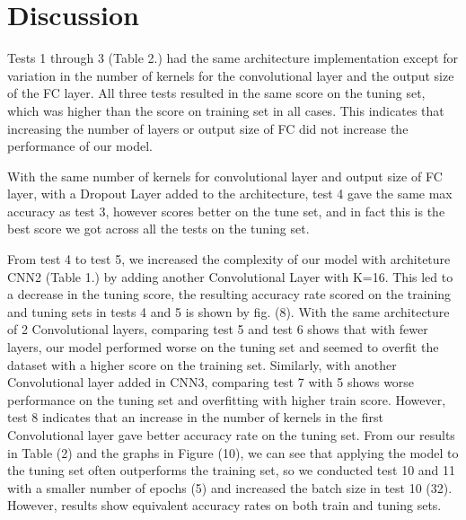 \documentclass{article}
\begin{document}
\section{Discussion}
Tests 1 through 3 (Table 2.) had the same architecture implementation except for variation in the number of kernels for the convolutional layer and the output size of the FC layer. All three tests resulted in the same score on the tuning set, which was higher than the score on training set in all cases. This indicates that increasing the  number of layers or output size of FC did not increase the performance of our model.

With the same number of kernels for convolutional layer and output size of FC layer, with a Dropout Layer added to the architecture, test 4 gave the same max accuracy as test 3, however scores better on the tune set, and in fact this is the best score we got across all the tests on the tuning set. 



 
From test 4 to test 5, we increased the complexity of our model with
architeture CNN2 (Table 1.)  by adding another Convolutional Layer
with K=16. This led to a decrease in the tuning score, the resulting
accuracy rate scored on the training and tuning sets in tests 4 and 5
is shown by fig. (8). With the same architecture of 2 Convolutional layers, comparing test 5 and test 6 shows that with fewer layers, our model performed worse on the tuning set and seemed to overfit the dataset with a higher score on the training set. Similarly, with another Convolutional layer added in CNN3, comparing test 7 with 5 shows worse performance on the tuning set and overfitting with higher train score. However, test 8 indicates that an increase in the number of kernels in the first Convolutional layer gave better accuracy rate on the tuning set. From our results in Table (2) and the graphs in Figure (10), we can see that applying the model to the tuning set often outperforms the training set, so we conducted test 10 and 11 with a smaller number of epochs (5) and increased the batch size in test 10 (32). However, results show equivalent accuracy rates on both train and tuning sets. 
\end{document}
